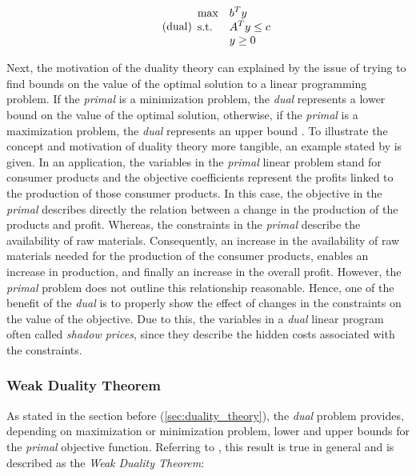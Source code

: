\begin{equation}
    \tag{dual}
    \begin{array}{ll@{}ll}
        \text{max}  & \displaystyle b^{T}y &\\
        \text{s.t.}& \displaystyle A^{T}y \leq c &\\
                    &                        y \geq 0
    \end{array}
\end{equation}


Next, the motivation of the duality theory can explained by the issue of trying to find 
bounds on the value of the optimal solution to a linear programming problem. 
If the \textit{primal} is a minimization problem, the \textit{dual} represents a lower bound
on the value of the optimal solution, otherwise, if the \textit{primal} is a maximization problem,
the \textit{dual} represents an upper bound .
To illustrate the concept and motivation of duality theory more tangible, an example stated by 
 is given. 
In an application, the variables in the \textit{primal} linear problem stand for consumer products and
the objective coefficients represent the profits linked to the production of those consumer products. 
In this case, the objective in the \textit{primal} describes directly the relation between a change
in the production of the products and profit. Whereas, the constraints in the \textit{primal} 
describe the availability of raw materials. Consequently, an increase in the availability of 
raw materials needed for the production of the consumer products, enables an increase in production,
and finally an increase in the overall profit. 
However, the \textit{primal} problem does not outline this relationship reasonable. Hence, one of 
the benefit of the \textit{dual} is to properly show the effect of changes in the constraints on the
value of the objective. Due to this, the variables in a \textit{dual} linear program often called 
\textit{shadow prices}, since they describe the hidden costs associated with the constraints. 

\subsubsection{Weak Duality Theorem}
As stated in the section before (\ref{sec:duality_theory}), the \textit{dual} problem 
provides, depending on maximization or minimization problem, lower and upper bounds for 
the \textit{primal} objective function. Referring to ,
this result is true in general and is described as the \textit{Weak Duality Theorem}:

